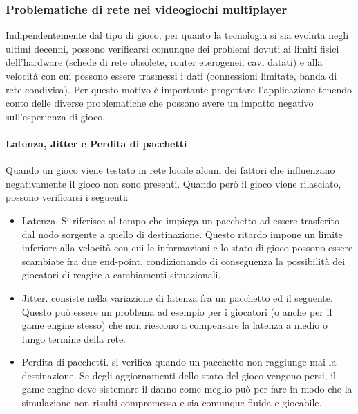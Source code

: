 \subsubsection{Problematiche di rete nei videogiochi multiplayer}
Indipendentemente dal tipo di gioco, per quanto la tecnologia si sia evoluta negli ultimi decenni, possono verificarsi comunque dei problemi dovuti ai limiti fisici dell'hardware (schede di rete obsolete, router eterogenei, cavi datati) e alla velocità con cui possono essere trasmessi i dati (connessioni limitate, banda di rete condivisa).
Per questo motivo è importante progettare l'applicazione tenendo conto delle diverse problematiche che possono avere un impatto negativo sull'esperienza di gioco.
\paragraph{Latenza, Jitter e Perdita di pacchetti}
Quando un gioco viene testato in rete locale alcuni dei fattori che influenzano negativamente il gioco non sono presenti. Quando però il gioco viene rilasciato, possono verificarsi i seguenti:
\begin{itemize}
    \item Latenza. Si riferisce al tempo che impiega un pacchetto ad essere trasferito dal nodo sorgente a quello di destinazione. Questo ritardo impone un limite inferiore alla velocità con cui le informazioni e lo stato di gioco possono essere scambiate fra due end-point, condizionando di conseguenza la possibilità dei giocatori di reagire a cambiamenti situazionali.
    \item Jitter. consiste nella variazione di latenza fra un pacchetto ed il seguente. Questo può essere un problema ad esempio per i giocatori (o anche per il game engine stesso) che non riescono a compensare la latenza a medio o lungo termine della rete.
    \item Perdita di pacchetti. si verifica quando un pacchetto non raggiunge mai la destinazione. Se degli aggiornamenti dello stato del gioco vengono persi, il game engine deve sistemare il danno come meglio può per fare in modo che la simulazione non risulti compromessa e sia comunque fluida e giocabile.
\end{itemize}

